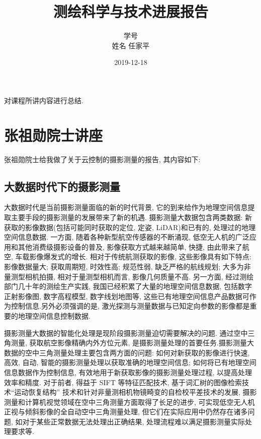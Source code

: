 \documentclass[12pt, a4paper, UTF8]{article}
\begin{document}
\title{\Huge 测绘科学与技术进展报告}
\author{学号 \\
        姓名 \quad 任家平}
\date{2019-12-18}
\maketitle
\thispagestyle{empty}

\newpage
{}
\tableofcontents

\newpage
{}
对课程所讲内容进行总结.

\section{张祖勋院士讲座}
张祖勋院士给我做了关于云控制的摄影测量的报告, 其内容如下:
\subsection{大数据时代下的摄影测量}
大数据时代是当前摄影测量面临的新的时代背景, 它的到来给作为地理空间信息提取主要手段的摄影测量的发展带来了新的机遇. 摄影测量大数据包含两类数据: 新获取的影像数据(包括可能同时获取的定位, 定姿, LiDAR)和已有的, 处理过的地理空间信息数据. 一方面, 随着各种新型航空传感器的不断涌现, 低空无人机的广泛应用和其他消费级摄影设备的普及, 影像获取方式越来越简单, 快捷, 由此带来了航空, 车载影像爆发式的增长. 相对于传统航测获取的影像, 这些影像具有如下特点: 影像数据量大; 获取周期短, 时效性高; 规范性弱, 缺乏严格的航线规划; 大多为非量测型相机拍摄, 相对于量测型相机而言, 影像几何质量不高. 另一方面, 经过测绘部门几十年的测绘生产实践, 我国已经积累了大量的地理空间信息数据, 包括数字正射影像图, 数字高程模型, 数字线划地图等, 这些已有地理空间信息产品数据可作为控制信息.另外必须强调的是, 激光探测与测量数据与已知定向参数的影像都是重要的地理空间信息控制数据. 

摄影测量大数据的智能化处理是现阶段摄影测量迫切需要解决的问题. 通过空中三角测量, 获取航空影像精确内外方位元素, 是摄影测量处理的首要任务.摄影测量大数据的空中三角测量处理主要包含两方面的问题: 如何对新获取的影像进行快速, 高效, 自动, 智能的摄影测量处理以获取准确的地理空间信息; 如何将已有地理空间信息数据作为控制信息, 有效地用于新获取影像的摄影测量处理过程, 以提高处理效率和精度. 对于前者, 得益于 SIFT 等特征匹配技术, 基于词汇树的图像检索技术“运动恢复结构” 技术和针对非量测相机物镜畸变的自检校平差技术的发展, 摄影测量和计算机视觉领域在空中三角测量方面取得了长足的进步, 可实现低空无人机正视与倾斜影像的全自动空中三角测量处理, 但它们在实际应用中仍然存在诸多问题, 如对于某些正常数据无法处理出正确结果, 处理流程难以满足摄影测量实际处理要求等.
\end{document}
